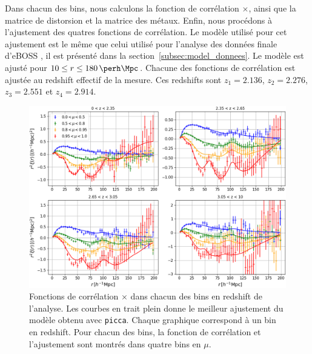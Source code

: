 \documentclass[11pt, twoside, a4paper, openright]{report}
\begin{document}
Dans chacun des bins, nous calculons la fonction de corrélation \lya{}$\times$\lya{}, ainsi que la matrice de distorsion et la matrice des métaux.
Enfin, nous procédons à l'ajustement des quatres fonctions de corrélation. Le modèle utilisé pour cet ajustement est le même que celui utilisé pour l'analyse des données finale d'eBOSS \autocite{prov}, il est présenté dans la section~\ref{subsec:model_donnees}.
Le modèle est ajusté pour $\num{10} \leq r \leq \SI{180}{\perh\Mpc}$.
Chacune des fonctions de corrélation est ajustée au redshift effectif de la mesure. Ces redshifts sont $z_1 = \num{2.136}$, $z_2 = \num{2.276}$, $z_3 = \num{2.551}$ et $z_4 = \num{2.914}$.

\begin{figure}
  \centering
  \includegraphics[scale=0.4]{dr16_4bins}
  \caption{Fonctions de corrélation \lya{}$\times$\lya{} dans chacun des bins en redshift de l'analyse. Les courbes en trait plein donne le meilleur ajustement du modèle obtenu avec \texttt{picca}. Chaque graphique correspond à un bin en redshift. Pour chacun des bins, la fonction de corrélation et l'ajustement sont montrés dans quatre bins en $\mu$.}
  \label{fig:dr16_4bins}
\end{figure}
\end{document}
